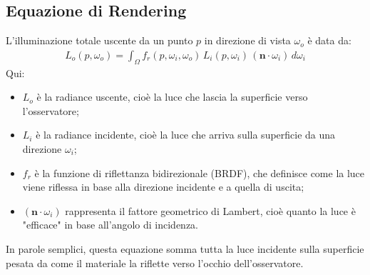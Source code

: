 \documentclass[12pt,a4paper,openright,twoside]{book}
\begin{document}
\subsection*{Equazione di Rendering}
L'illuminazione totale uscente da un punto $p$ in direzione di vista $\omega_o$ è data da:
\begin{align*}
L_o(p,\omega_o) = \int_{\Omega} f_r(p,\omega_i,\omega_o) \, L_i(p,\omega_i)\, (\mathbf{n}\cdot\omega_i)\,d\omega_i
\end{align*}
\noindent
Qui:
\begin{itemize}
    \item $L_o$ è la radiance uscente, cioè la luce che lascia la superficie verso l'osservatore;
    \item $L_i$ è la radiance incidente, cioè la luce che arriva sulla superficie da una direzione $\omega_i$;
    \item $f_r$ è la funzione di riflettanza bidirezionale (BRDF), che definisce come la luce viene riflessa in base alla direzione incidente e a quella di uscita;
    \item $(\mathbf{n}\cdot\omega_i)$ rappresenta il fattore geometrico di Lambert, cioè quanto la luce è "efficace" in base all'angolo di incidenza.
\end{itemize}
In parole semplici, questa equazione somma tutta la luce incidente sulla superficie pesata da come il materiale
la riflette verso l'occhio dell'osservatore.
\end{document}
